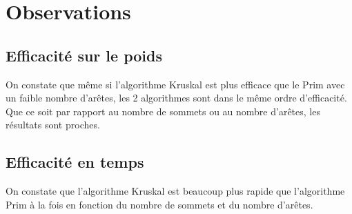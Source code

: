 \documentclass[a4paper,10pt]{report}
\begin{document}
\chapter{Observations}


\section{Efficacité sur le poids}

On constate que même si l'algorithme Kruskal est plus efficace que le Prim avec un faible nombre d'arêtes, les 2 algorithmes sont dans le même ordre d'efficacité. Que ce soit par rapport au nombre de sommets ou au nombre d'arêtes, les résultats sont proches.

\section{Efficacité en temps}

On constate que l'algorithme Kruskal est beaucoup plus rapide que l'algorithme Prim à la fois en fonction du nombre de sommets et du nombre d'arêtes.
\end{document}
